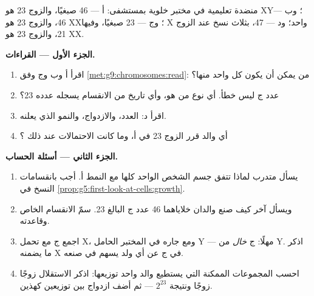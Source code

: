 \begin{problem}\label{pb:g9:chromosomes:1}
منضدة تعليمية في مختبر  خلوية بمستشفى: 
أ --- 46 صبغيًا، والزوج 23 هو XY؛ وب --- 46، والزوج 23
هو XX؛ وج --- 23 صبغيًا، وفيها X واحد؛ ود --- 47، بثلاث
نسخ عند الزوج 21، والزوج 23 هو XX.

\medskip\noindent\textbf{الجزء الأول --- القراءات.}
\begin{enumerate}
  \item اقرأ أ وب وج وفق \cref{met:g9:chromosomes:read}:
         من يمكن أن يكون كل واحد منها؟
  \item عدد ج ليس خطأ. أي نوع من  هو، وأي تاريخ
        من الانقسام يسجله عدده 23؟
  \item اقرأ د: العدد، والازدواج، والنمو الذي يعلنه.
  \item {} أي والد قرر الزوج 23 في أ، وما كانت
        الاحتمالات عند ذلك ؟
\end{enumerate}

\medskip\noindent\textbf{الجزء الثاني --- أسئلة
الحساب.}
\begin{enumerate}[resume]
  \item يسأل متدرب لماذا تتفق  جسم الشخص الواحد
        كلها مع النمط أ. أجب بانقسامات النسخ في
        \cref{prop:g5:first-look-at-cells:growth}.
  \item ويسأل آخر كيف صنع والدان خلاياهما 46 عدد ج
        البالغ 23. سمّ الانقسام الخاص وقاعدته.
  \item اجمع ج مع  تحمل X، ومع جاره في المختبر
        الحامل  Y --- مهلًا: ج \emph{خال} من Y.
        اذكر ما يضمنه X في ج عن أي ولد يسهم في صنعه.
  \item احسب المجموعات الممكنة التي يستطيع والد واحد
        توزيعها: اذكر الاستقلال زوجًا زوجًا ونتيجة
        $2^{23}$ --- ثم أضف ازدواج  بين توزيعين
        كهذين.
\end{enumerate}


\end{problem}
